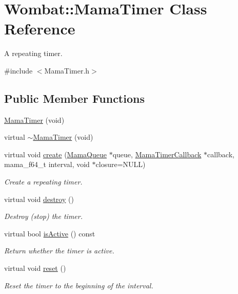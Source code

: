 \hypertarget{classWombat_1_1MamaTimer}{
\section{Wombat::MamaTimer Class Reference}
\label{classWombat_1_1MamaTimer}
}


A repeating timer.  


{\ttfamily \#include $<$MamaTimer.h$>$}\subsection*{Public Member Functions}
\begin{DoxyCompactItemize}
\item 
\hyperlink{classWombat_1_1MamaTimer_ab882f603a9dc4107745161d0ad2073eb}{MamaTimer} (void)
\item 
virtual \hyperlink{classWombat_1_1MamaTimer_a502a055afb936ed7cf743e22dfb5a758}{$\sim$MamaTimer} (void)
\item 
virtual void \hyperlink{classWombat_1_1MamaTimer_a2d093ee2832a58fa2066165d81c33855}{create} (\hyperlink{classWombat_1_1MamaQueue}{MamaQueue} $\ast$queue, \hyperlink{classWombat_1_1MamaTimerCallback}{MamaTimerCallback} $\ast$callback, mama\_\-f64\_\-t interval, void $\ast$closure=NULL)
\begin{DoxyCompactList}\small\item\em Create a repeating timer. \item\end{DoxyCompactList}\item 
virtual void \hyperlink{classWombat_1_1MamaTimer_ab2679f665be9f30904d7ac2d70a67875}{destroy} ()
\begin{DoxyCompactList}\small\item\em Destroy (stop) the timer. \item\end{DoxyCompactList}\item 
virtual bool \hyperlink{classWombat_1_1MamaTimer_a9acf421fb2515a0250b6cfe36a927c1e}{isActive} () const 
\begin{DoxyCompactList}\small\item\em Return whether the timer is active. \item\end{DoxyCompactList}\item 
virtual void \hyperlink{classWombat_1_1MamaTimer_a11812aff6b0effb65fe845c3391033e1}{reset} ()
\begin{DoxyCompactList}\small\item\em Reset the timer to the beginning of the interval. \item\end{DoxyCompactList}\item 

\end{DoxyCompactItemize}
